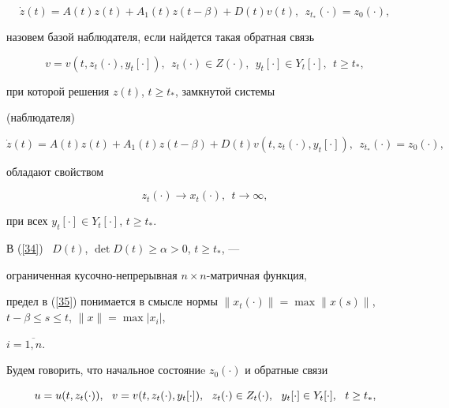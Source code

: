 \begin{equation}\label{34}


\Dot z (t) = A(t)z(t)+A_1(t)z(t-\beta)+D(t)v(t),


\ \ z_{t_*}(\cdot)=z_0(\cdot),


\end{equation}


назовем базой наблюдателя, если найдется такая обратная связь


$$


v=v(t,z_t(\cdot), y_t[\cdot]),\ \ z_t(\cdot) \in Z(\cdot),\ \ y_t[\cdot]


\in Y_t[\cdot],\ \ t \ge t_*,


$$


при которой решения $z(t)$, $t \ge t_*$, замкнутой системы


(наблюдателя)


$$


\Dot z (t) = A(t)z(t)+A_1(t)z(t-\beta)+D(t)v(t,z_t(\cdot), y_t[\cdot]),


\ \ z_{t_*}(\cdot)=z_0(\cdot),


$$


обладают свойством


\begin{equation}\label{35}


z_t(\cdot) \rightarrow x_t(\cdot),\ \ t \rightarrow \infty,


\end{equation}


при всех $y_t[\cdot] \in Y_{t}[\cdot]$, $t \ge t_*$.





В (\ref{34}) \ $D(t)$, $\det D(t) \ge \alpha > 0$, $t \ge t_*$, ---


ограниченная кусочно-непрерывная $n \times n$-матричная функция,


предел в (\ref{35}) понимается в смысле нормы $\|x_t(\cdot)\| =


\max \|x(s)\|$, $t -\beta \le s \le t$, $\|x\|=\max|x_i|$,


$i=\overline{1,n}$.





Будем говорить, что начальное состояниe $z_0(\cdot)$ и обратные связи


\begin{equation}{\label{36}}


u=u(t,z_t(\cdot)),\ \ v=v(t,z_t(\cdot),y_t[\cdot]),\ \ z_t(\cdot) \in


Z_t(\cdot),\ \ y_t[\cdot] \in Y_{t}[\cdot],\ \ t \ge t_*,


\end{equation}


